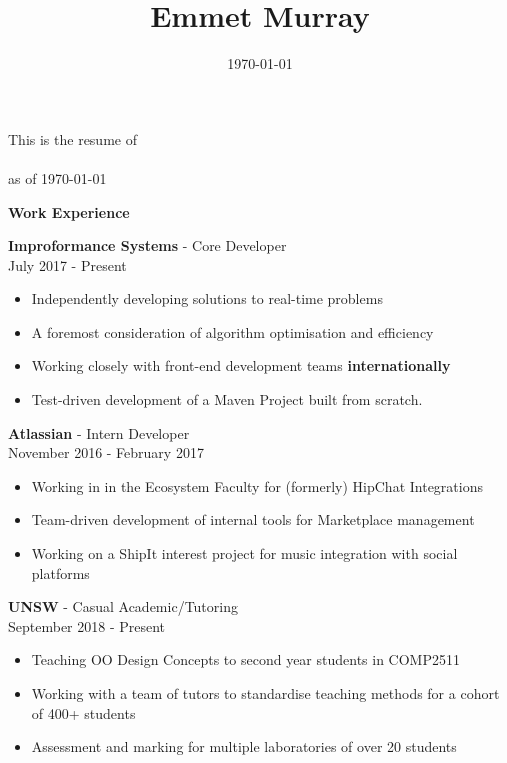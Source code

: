 \documentclass[a4paper]{article}
\title{\textbf{Emmet Murray}}
\date{\today}
\newcommand{\minititle}[1]{{\Large \begin{center} \textbf{#1} \end{center}} \vspace{0.2cm}}
\newcommand{\resumeEntry}[3]{{\large \textbf{#1} - #2} \\ \small{#3} }
\begin{document}
 

\begin{center}
    This is the resume of \\
     \\
    \vspace{0.2cm}
    as of \today
\end{center}
\begin{minipage}[t]{0.6\linewidth}   
    {
        \minititle{Work Experience}
        \resumeEntry{Improformance Systems}{Core Developer}{July 2017 - Present}
        \begin{itemize}
            \setlength\itemsep{0.03cm}
            \item Independently developing solutions to real-time problems
            \item A foremost consideration of algorithm optimisation and efficiency
            \item Working closely with front-end development teams  \textbf{internationally}
            \item Test-driven development of a Maven Project built from scratch.
        \end{itemize}
        \vspace{0.3cm}
        \resumeEntry{Atlassian}{Intern Developer}{November 2016 - February 2017}
        \begin{itemize}
            \setlength\itemsep{0.03cm}
            \item Working in in the Ecosystem Faculty for (formerly) HipChat Integrations
            \item Team-driven development of internal tools for Marketplace management
            \item Working on a ShipIt interest project for music integration with social platforms
        \end{itemize}
        \vspace{0.3cm}
        \resumeEntry{UNSW}{Casual Academic/Tutoring}{September 2018 - Present}
        \begin{itemize}
            \setlength\itemsep{0.03cm}
            \item Teaching OO Design Concepts to second year students in COMP2511
            \item Working with a team of tutors to standardise teaching methods for a cohort of 400+ students
            \item Assessment and marking for multiple laboratories of over 20 students

\end{itemize}}
\end{minipage}
\end{document}
